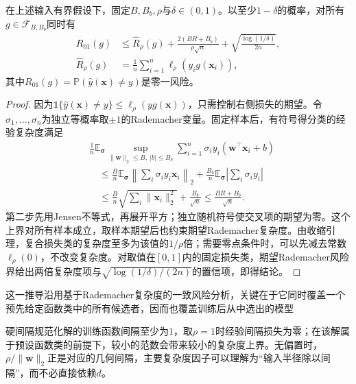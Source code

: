 \begin{theorem}[含偏置的间隔风险界]
  \label{thm:classification-svm-margin-bound}
  在上述输入有界假设下，固定$B,B_b,\rho$与$\delta\in(0,1)$。以至少$1-\delta$的概率，对所有$g\in\mathcal{F}_{B,B_b}$同时有
  \begin{equation}
    \begin{aligned}
      R_{01}(g)
      &\le \widehat R_\rho(g)
       +\frac{2(BR+B_b)}{\rho\sqrt n}
       +\sqrt{\frac{\log(1/\delta)}{2n}},\\
      \widehat R_\rho(g)
      &=\frac1n\sum_{i=1}^n\ell_\rho(y_i g(\bm{x}_i)),
    \end{aligned}
    \label{eq:classification-svm-margin-bound}
  \end{equation}
  其中$R_{01}(g)=\mathbb{P}(\hat y(\bm{x})\ne y)$是零一风险。
\end{theorem}
\begin{proof}
因为$\mathbb{1}\{\hat y(\bm{x})\ne y\}\le\ell_\rho(y g(\bm{x}))$，只需控制右侧损失的期望。令$\sigma_1,\ldots,\sigma_n$为独立等概率取$\pm1$的Rademacher变量。固定样本后，有符号得分类的经验复杂度满足
\[
  \begin{aligned}
    &\frac1n\mathbb{E}_{\bm{\sigma}}
      \sup_{\lVert\bm{w}\rVert_2\le B,\ |b|\le B_b}
      \sum_{i=1}^n\sigma_i y_i
       (\bm{w}^{\top}\bm{x}_i+b)\\
    &\quad\le
      \frac{B}{n}\mathbb{E}_{\bm{\sigma}}
        \left\lVert\sum_i\sigma_i y_i\bm{x}_i\right\rVert_2
      +\frac{B_b}{n}\mathbb{E}_{\bm{\sigma}}
        \left|\sum_i\sigma_i y_i\right|\\
    &\quad\le
      \frac{B}{n}\sqrt{\sum_i\lVert\bm{x}_i\rVert_2^2}
      +\frac{B_b}{\sqrt n}
      \le\frac{BR+B_b}{\sqrt n}.
  \end{aligned}
\]
第二步先用Jensen不等式，再展开平方；独立随机符号使交叉项的期望为零。这个上界对所有样本成立，取样本期望后也约束期望Rademacher复杂度。由收缩引理，复合损失类的复杂度至多为该值的$1/\rho$倍；需要零点条件时，可以先减去常数$\ell_\rho(0)$，不改变复杂度。对取值在$[0,1]$内的固定损失类，期望Rademacher风险界给出两倍复杂度项与$\sqrt{\log(1/\delta)/(2n)}$的置信项，即得结论。
\end{proof}

这一推导沿用基于Rademacher复杂度的一致风险分析，关键在于它同时覆盖一个预先给定函数类中的所有候选者，因而也覆盖训练后从中选出的模型

硬间隔规范化解的训练函数间隔至少为$1$，取$\rho=1$时经验间隔损失为零；在该解属于预设函数类的前提下，较小的范数会带来较小的复杂度上界。无偏置时，$\rho/\lVert\bm{w}\rVert_2$正是对应的几何间隔，主要复杂度因子可以理解为“输入半径除以间隔”，而不必直接依赖$d$。

